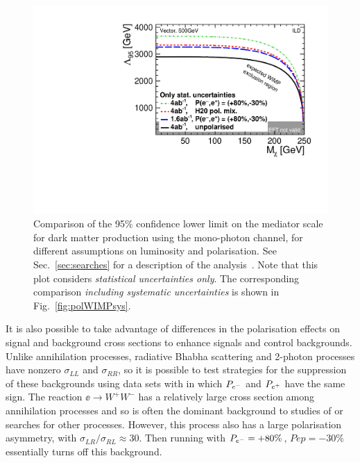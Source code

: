 \begin{figure}
\centering
\includegraphics[width=0.95\linewidth]{./chapters/figures/vector_noSystematics.pdf}
		
\caption{Comparison of the 95\% confidence lower limit on the mediator scale for dark matter production using  the mono-photon channel,  for different assumptions on luminosity and polarisation.  See Sec.~\ref{sec:searches} for a description of the analysis~\cite{Habermehl:417605}. Note that this plot considers {\em statistical uncertainties only}. The corresponding comparison {\em including systematic uncertainties} is shown in Fig.~\ref{fig:polWIMPsys}.}
\label{fig:polWIMPstat}
\end{figure}



It is also possible to take advantage of differences in the polarisation effects on signal and background cross sections to enhance signals and control backgrounds.  Unlike annihilation processes, radiative Bhabha scattering and 2-photon processes have nonzero $\sigma_{LL}$ and $\sigma_{RR}$, so it is possible to test strategies for the suppression of these backgrounds using  data sets with
in which $P_{e^-}$ and $P_{e^+}$ have the same sign.   The reaction $\ee\to W^+W^-$ has a relatively large cross section among 
annihilation processes and so is often the dominant background to studies of or searches for other processes.   However, this process also has a large polarisation asymmetry, with $\sigma_{LR}/\sigma_{RL} \approx 30$.  Then running with $P_{e^-} = +80\%$, $Pep = -30\%$ essentially turns off this background.   

